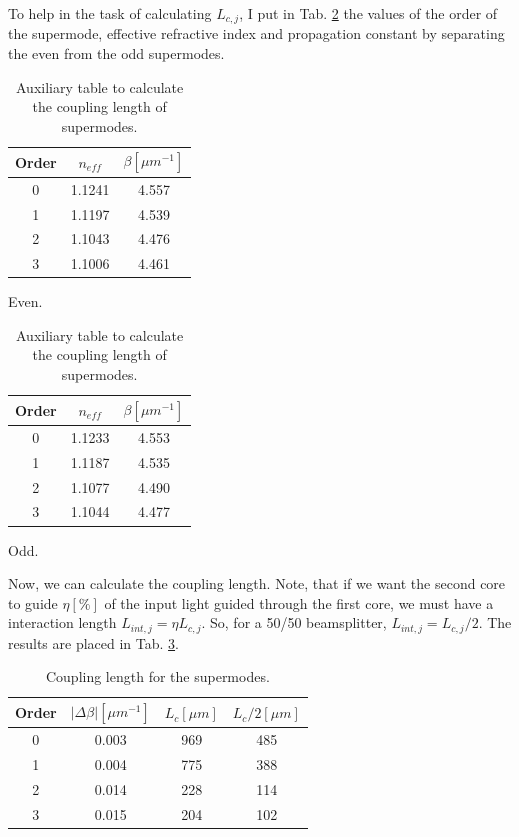 \documentclass[a4paper,12pt]{article}
\begin{document}
To help in the task of calculating $L_{c,j}$, I put in Tab. \ref{tab:coupling_length_aux} the values of the order of the supermode, effective refractive index and propagation constant by separating the even from the odd supermodes.

\begin{table}[H]
    \centering
    \begin{subtable}{0.45\textwidth}
        \centering
        \begin{tabular}{ccc}
            \toprule
            Order & $n_{eff}$ & $\beta [\mu m^{-1}]$ \\
            \midrule
            0 & 1.1241 & 4.557 \\
            1 & 1.1197 & 4.539 \\
            2 & 1.1043 & 4.476 \\
            3 & 1.1006 & 4.461 \\
            \bottomrule
        \end{tabular}
        \caption{Even.}
    \end{subtable}
    \hfill
    \begin{subtable}{0.45\textwidth}
        \centering
        \begin{tabular}{ccc}
            \toprule
            Order & $n_{eff}$ & $\beta [\mu m^{-1}]$ \\
            \midrule
            0 & 1.1233 & 4.553 \\
            1 & 1.1187 & 4.535 \\
            2 & 1.1077 & 4.490 \\
            3 & 1.1044 & 4.477 \\
            \bottomrule
        \end{tabular}
        \caption{Odd.}
    \end{subtable}
    \caption{Auxiliary table to calculate the coupling length of supermodes.}
    \label{tab:coupling_length_aux}
\end{table}

Now, we can calculate the coupling length. Note, that if we want the second core to guide $\eta [\%]$ of the input light guided through the first core, we must have a interaction length $L_{int, j} = \eta L_{c, j}$. So, for a 50/50 beamsplitter, $L_{int, j} = L_{c,j} / 2$. The results are placed in Tab. \ref{tab:coupling_length}.

\begin{table}[H]
    \centering
    \begin{tabular}{cccc}
        \toprule
        Order & $|\Delta \beta| [\mu m^{-1}]$ & $L_c [\mu m]$ & $L_{c}/2 [\mu m]$ \\
        \midrule
        0 & 0.003 & 969 & 485 \\     
        1 & 0.004 & 775 & 388 \\
        2 & 0.014 & 228 & 114 \\
        3 & 0.015 & 204 & 102 \\
        \bottomrule
    \end{tabular}
    \caption{Coupling length for the supermodes.}
    \label{tab:coupling_length}
\end{table}
\end{document}
